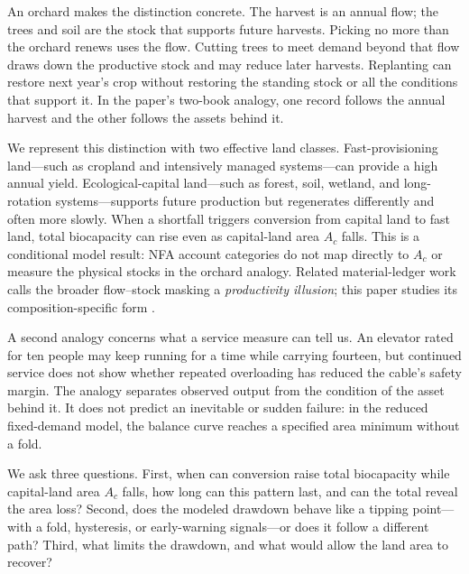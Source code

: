 \documentclass[preprint,12pt,authoryear]{elsarticle}
\begin{document}
An orchard makes the distinction concrete. The harvest is an annual flow; the trees and soil are the stock that supports future harvests. Picking no more than the orchard renews uses the flow. Cutting trees to meet demand beyond that flow draws down the productive stock and may reduce later harvests. Replanting can restore next year's crop without restoring the standing stock or all the conditions that support it. In the paper's two-book analogy, one record follows the annual harvest and the other follows the assets behind it.

We represent this distinction with two effective land classes. Fast-provisioning land—such as cropland and intensively managed systems—can provide a high annual yield. Ecological-capital land—such as forest, soil, wetland, and long-rotation systems—supports future production but regenerates differently and often more slowly. When a shortfall triggers conversion from capital land to fast land, total biocapacity can rise even as capital-land area $A_c$ falls. This is a conditional model result: NFA account categories do not map directly to $A_c$ or measure the physical stocks in the orchard analogy. Related material-ledger work calls the broader flow--stock masking a \emph{productivity illusion}; this paper studies its composition-specific form \citep{Abaee2026c}.

A second analogy concerns what a service measure can tell us. An elevator rated for ten people may keep running for a time while carrying fourteen, but continued service does not show whether repeated overloading has reduced the cable's safety margin. The analogy separates observed output from the condition of the asset behind it. It does not predict an inevitable or sudden failure: in the reduced fixed-demand model, the balance curve reaches a specified area minimum without a fold.

We ask three questions. First, when can conversion raise total biocapacity while capital-land area $A_c$ falls, how long can this pattern last, and can the total reveal the area loss? Second, does the modeled drawdown behave like a tipping point—with a fold, hysteresis, or early-warning signals—or does it follow a different path? Third, what limits the drawdown, and what would allow the land area to recover?
\end{document}
